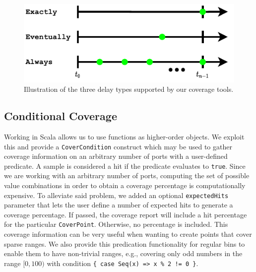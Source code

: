 \documentclass[conference]{IEEEtran}
\begin{document}
\begin{figure}
    \centering
    \includegraphics[width=.8\linewidth]{TimedCoverage.pdf}
    \caption{Illustration of the three delay types supported by our coverage tools.}
    \label{fig:delay}
\end{figure}

\subsection{Conditional Coverage} \label{sec:conditional_coverage}
Working in Scala allows us to use functions as higher-order objects. 
We exploit this and provide a \texttt{CoverCondition} construct which may be used to gather coverage information on an arbitrary number of ports with a user-defined predicate. %
 A sample is considered a hit if the predicate evaluates to \texttt{true}. %
 Since we are working with an arbitrary number of ports, computing the set of possible value combinations in order to obtain a coverage percentage is computationally expensive. 
To alleviate said problem, we added an optional \texttt{expectedHits} parameter that lets the user define a number of expected hits to generate a coverage percentage. If passed, the coverage report will include a hit percentage for the particular \texttt{CoverPoint}. Otherwise, no percentage is included.
This coverage information can be very useful when wanting to create points that cover sparse ranges.   
We also provide this predication functionality for regular bins to enable them to have non-trivial ranges, e.g., covering only odd numbers in the range $[0,100)$ with condition \texttt{\{ case Seq(x) => x \% 2 != 0 \}}.%
\end{document}
